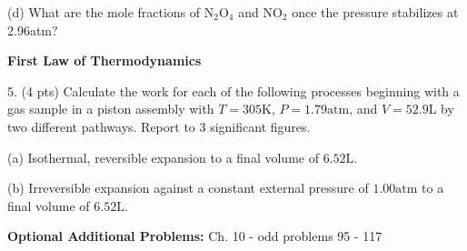 \documentclass[11pt]{article}
\begin{document}
(d) What are the mole fractions of N$_2$O$_4$ and NO$_2$ once the pressure stabilizes at
2.96atm?

\vspace{3in}

\textbf{First Law of Thermodynamics}

5. (4 pts) Calculate the work for each of the following processes beginning with a gas
sample in a piston assembly with $T=305\text{K}$, $P=1.79\text{atm}$, and
$V=52.9\text{L}$ by two different pathways. Report to 3 significant figures.

(a) Isothermal, reversible expansion to a final volume of $6.52\text{L}$.

(b) Irreversible expansion against a constant external pressure of $1.00\text{atm}$
to a final volume of $6.52\text{L}$.

\vfill
\textbf{Optional Additional Problems:} Ch. 10 - odd problems 95 - 117
\end{document}
